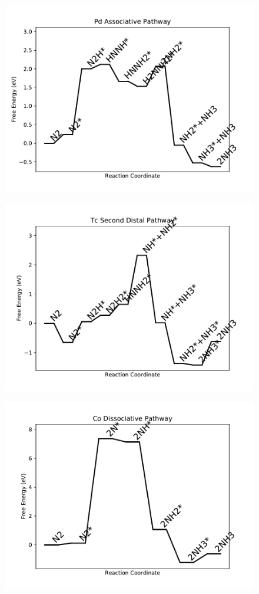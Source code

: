 \begin{figure}
\includegraphics[width=0.8\linewidth]{data/plots/Pd_associative.pdf}
\end{figure}

\begin{figure}
\includegraphics[width=0.8\linewidth]{data/plots/Tc_distal_2.pdf}
\end{figure}

\begin{figure}
\includegraphics[width=0.8\linewidth]{data/plots/Co_dissociative.pdf}
\end{figure}

